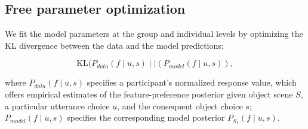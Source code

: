\documentclass[10pt,a4paper]{article}
\begin{document}
\subsection{Free parameter optimization}

We fit the model parameters at the group and individual levels by optimizing the KL divergence between the data and the model predictions:

\begin{equation}
\textrm{KL}(P_{data}(f \mid u,s)\mid\mid (P_{model}(f\mid u,s)),
\end{equation}

\noindent where $P_{data}(f\mid u,s)$ specifies a participant's normalized response value, which offers empirical estimates of the feature-preference posterior given object scene $S$, a particular utterance choice $u$, and the consequent object choice $s$;
$P_{model}(f\mid u,s)$ specifies the corresponding model posterior $P_{S_{1}}(f\mid u,s)$. 

\end{document}

